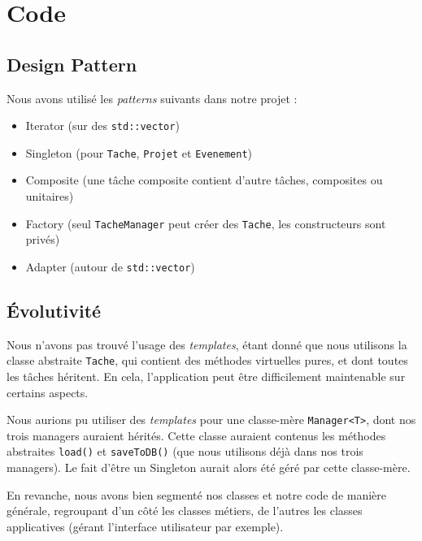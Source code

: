 \chapter{Code}

\section{Design Pattern}
\noindent Nous avons utilisé les \textit{patterns} suivants dans notre projet :
\begin{itemize}
  \item Iterator (sur des \lstinline{std::vector})
  \item Singleton (pour \lstinline{Tache}, \lstinline{Projet} et \lstinline{Evenement})
  \item Composite (une tâche composite contient d'autre tâches, composites ou unitaires)
  \item Factory (seul \lstinline{TacheManager} peut créer des \lstinline{Tache}, les constructeurs sont privés)
  \item Adapter (autour de \lstinline{std::vector})
\end{itemize}

\section{Évolutivité}
Nous n'avons pas trouvé l'usage des \textit{templates}, étant donné que nous utilisons la classe abstraite \lstinline{Tache}, qui contient des méthodes virtuelles pures, et dont toutes les tâches héritent. En cela, l'application peut être difficilement maintenable sur certains aspects.

\medskip

Nous aurions pu utiliser des \textit{templates} pour une classe-mère \lstinline{Manager<T>}, dont nos trois managers auraient hérités. Cette classe auraient contenus les méthodes abstraites \lstinline{load()} et \lstinline{saveToDB()} (que nous utilisons déjà dans nos trois managers). Le fait d'être un Singleton aurait alors été géré par cette classe-mère.

\bigskip

En revanche, nous avons bien segmenté nos classes et notre code de manière générale, regroupant d'un côté les classes métiers, de l'autres les classes applicatives (gérant l'interface utilisateur par exemple).